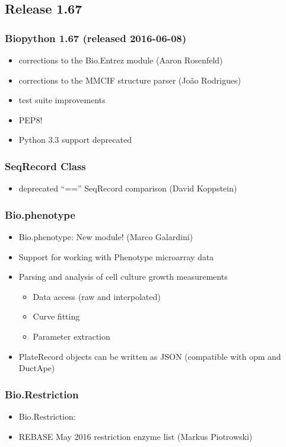 \documentclass[trans]{beamer}
\begin{document}
\subsection*{Release 1.67}
\frame
{
  \frametitle{Biopython 1.67 (released 2016-06-08)}

  \begin{itemize}
  \item corrections to the Bio.Entrez module (Aaron Rosenfeld)
  \item corrections to the MMCIF structure parser (João Rodrigues)
  \item test suite improvements
  \item PEP8!
  \item Python 3.3 support deprecated
  \end{itemize}
}

\frame
{
  \frametitle{SeqRecord Class}
  
  \begin{itemize}
  \item deprecated ``=='' SeqRecord comparison (David Koppstein)
  \end{itemize}
}

\frame
{
  \frametitle{Bio.phenotype}
  
  \begin{itemize}
  \item Bio.phenotype: New module! (Marco Galardini)
  \item Support for working with Phenotype microarray data
  \item Parsing and analysis of cell culture growth measurements
  \begin{itemize}
  \item Data access (raw and interpolated)
  \item Curve fitting
  \item Parameter extraction
  \end{itemize}
  \item PlateRecord objects can be written as JSON (compatible with opm and DuctApe)
  \end{itemize}
}

\frame
{
  \frametitle{Bio.Restriction}
  
  \begin{itemize}
  \item Bio.Restriction: 
  \item REBASE May 2016 restriction enzyme list (Markus Piotrowski)
  \end{itemize}
}
\end{document}
